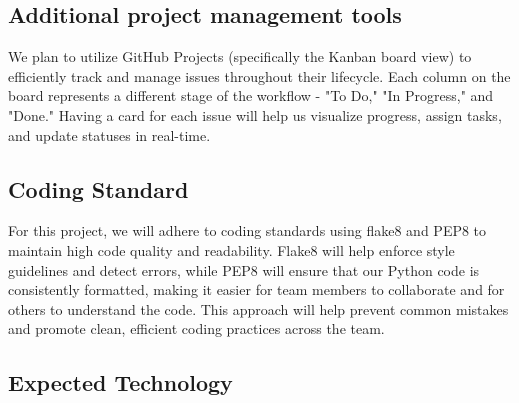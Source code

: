 \documentclass{article}
\begin{document}
\subsection{Additional project management tools}

We plan to utilize GitHub Projects (specifically the Kanban board view) to efficiently track and manage issues throughout their lifecycle. Each column on the board represents a different stage of the workflow - "To Do," "In Progress," and "Done." Having a card for each issue will help us visualize progress, assign tasks, and update statuses in real-time.

\subsection{Coding Standard}
For this project, we will adhere to coding standards using flake8 and PEP8 to 
maintain high code quality and readability. Flake8 will help enforce style 
guidelines and detect errors, while PEP8 will ensure that our Python code is 
consistently formatted, making it easier for team members to collaborate and 
for others to understand the code. This approach will help prevent common 
mistakes and promote clean, efficient coding practices across the team.

\subsection{Expected Technology}


\end{document}
